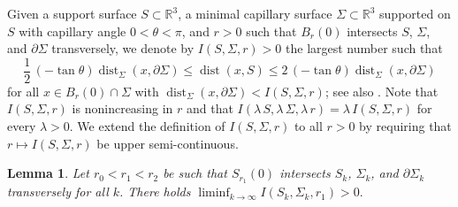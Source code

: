 \documentclass[11pt]{amsart}
\newtheorem{lem}[prop]{Lemma}
\begin{document}
	Given a support surface $S\subset \mathbb{R}^3$, a minimal capillary surface  $\Sigma\subset \mathbb{R}^3$ supported on $S$  with capillary angle $0<\theta<\pi$, and  $r>0$ such that $B_r(0)$ intersects $S$, $\Sigma$, and $\partial \Sigma$ transversely, we denote by  $I(S,\Sigma,r)>0$ the largest number such that 
$$
\frac{1}{2}\,(-\tan\theta)\operatorname{dist}_\Sigma(x,\partial \Sigma)\leq \operatorname{dist}(x,S)\leq 2\,(-\tan\theta)\operatorname{dist}_\Sigma(x,\partial \Sigma)
$$ 
for all $x\in B_r(0)\cap \Sigma $ with $\operatorname{dist}_\Sigma(x,\partial \Sigma)<I(S,\Sigma,r)$;
see also \cite[Lemma 4.13]{chodoshedelenli}.
Note that $I(S,\Sigma,r)$ is  nonincreasing  in $r$ and that $I(\lambda\,S,\lambda\,\Sigma,\lambda\,r)=\lambda\,I(S,\Sigma,r)$ for every $\lambda>0$. We extend the definition of $I(S,\Sigma,r)$ to all $r>0$ by requiring that $r\mapsto I(S,\Sigma,r)$  be upper semi-continuous. 
\begin{lem} \label{uniform graphicality}
Let  $r_0<r_1<r_2$ be such that $S_{r_1}(0)$ intersects $S_k$, $\Sigma_k$, and $\partial \Sigma_k$ transversely for all $k$. There holds $\liminf_{k\to\infty}I(S_k,\Sigma_k,r_1)>0.$
\end{lem}
\end{document}

